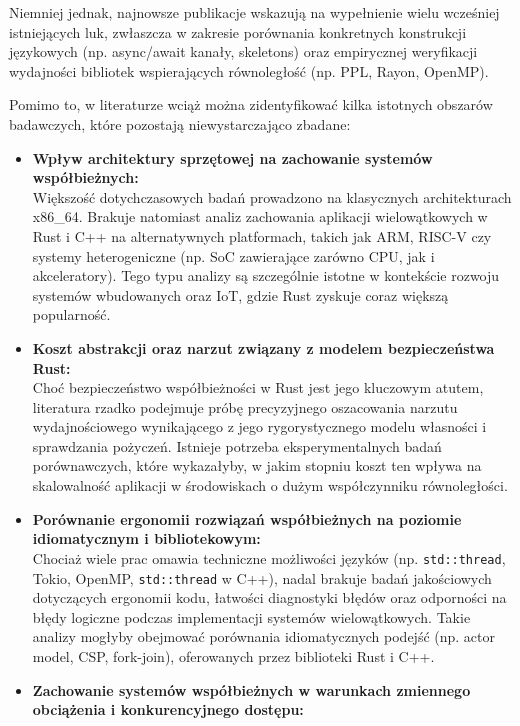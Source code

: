 Niemniej jednak, najnowsze publikacje wskazują na wypełnienie wielu wcześniej istniejących luk, zwłaszcza w zakresie porównania konkretnych konstrukcji językowych \linebreak (np. \mbox{async/await} kanały, skeletons) oraz empirycznej weryfikacji wydajności bibliotek wspierających równoległość (np. PPL, Rayon, OpenMP).

Pomimo to, w literaturze wciąż można zidentyfikować kilka istotnych obszarów badawczych, które pozostają niewystarczająco zbadane:
\begin{itemize}
    \item \textbf{Wpływ architektury sprzętowej na zachowanie systemów współbieżnych:}\\
    Większość dotychczasowych badań prowadzono na klasycznych architekturach x86\_64. Brakuje natomiast analiz zachowania aplikacji wielowątkowych w Rust i C++ na alternatywnych platformach, takich jak ARM, RISC-V czy systemy heterogeniczne (np. SoC zawierające zarówno CPU, jak i akceleratory). Tego typu analizy są szczególnie istotne w kontekście rozwoju systemów wbudowanych oraz IoT, gdzie Rust zyskuje coraz większą popularność.
    \item \textbf{Koszt abstrakcji oraz narzut związany z modelem bezpieczeństwa Rust:}\\
    Choć bezpieczeństwo współbieżności w Rust jest jego kluczowym atutem, literatura rzadko podejmuje próbę precyzyjnego oszacowania narzutu wydajnościowego wynikającego z jego rygorystycznego modelu własności i sprawdzania pożyczeń. Istnieje potrzeba eksperymentalnych badań porównawczych, które wykazałyby, w jakim stopniu koszt ten wpływa na skalowalność aplikacji w środowiskach o dużym współczynniku równoległości.
    \item \textbf{Porównanie ergonomii rozwiązań współbieżnych na poziomie idiomatycznym i bibliotekowym:}\\
    Chociaż wiele prac omawia techniczne możliwości języków (np. \texttt{std::thread}, Tokio, OpenMP, \texttt{std::thread} w C++), nadal brakuje badań jakościowych dotyczących ergonomii kodu, łatwości diagnostyki błędów oraz odporności na błędy logiczne podczas implementacji systemów wielowątkowych. Takie analizy mogłyby obejmować porównania idiomatycznych podejść (np. actor model, CSP, fork-join), oferowanych przez biblioteki Rust i C++.
    \item \textbf{Zachowanie systemów współbieżnych w warunkach zmiennego obciążenia i konkurencyjnego dostępu:}\\

\end{itemize}
